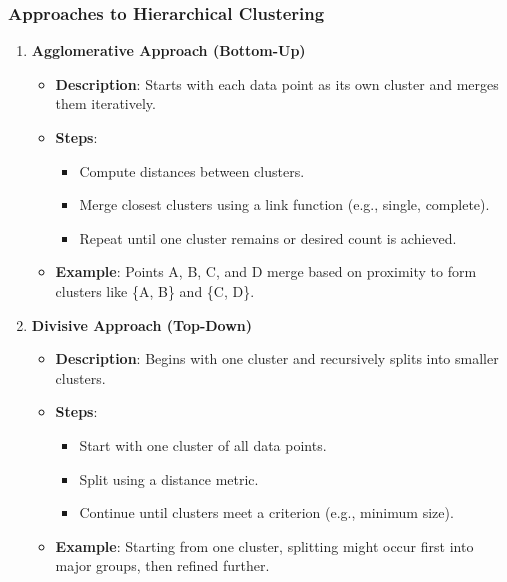 \documentclass[aspectratio=169]{beamer}
\begin{document}
\begin{frame}[fragile]
    \frametitle{Approaches to Hierarchical Clustering}
    \begin{enumerate}
        \item \textbf{Agglomerative Approach (Bottom-Up)}
        \begin{itemize}
            \item \textbf{Description}: Starts with each data point as its own cluster and merges them iteratively.
            \item \textbf{Steps}:
            \begin{itemize}
                \item Compute distances between clusters.
                \item Merge closest clusters using a link function (e.g., single, complete).
                \item Repeat until one cluster remains or desired count is achieved.
            \end{itemize}
            \item \textbf{Example}: Points A, B, C, and D merge based on proximity to form clusters like \{A, B\} and \{C, D\}.
        \end{itemize}

        \item \textbf{Divisive Approach (Top-Down)}
        \begin{itemize}
            \item \textbf{Description}: Begins with one cluster and recursively splits into smaller clusters.
            \item \textbf{Steps}:
            \begin{itemize}
                \item Start with one cluster of all data points.
                \item Split using a distance metric.
                \item Continue until clusters meet a criterion (e.g., minimum size).
            \end{itemize}
            \item \textbf{Example}: Starting from one cluster, splitting might occur first into major groups, then refined further.
        \end{itemize}
    \end{enumerate}
\end{frame}
\end{document}
